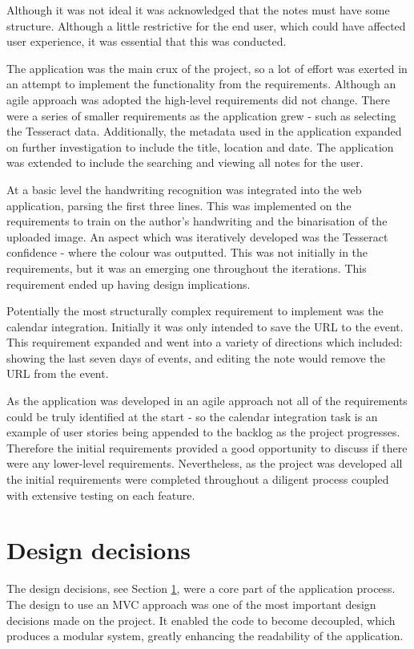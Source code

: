 Although it was not ideal it was acknowledged that the notes must have some structure. Although a little restrictive for the end user, which could have affected user experience, it was essential that this was conducted.

The application was the main crux of the project, so a lot of effort was exerted in an attempt to implement the functionality from the requirements. Although an agile approach was adopted the high-level requirements did not change. There were a series of smaller requirements as the application grew - such as selecting the Tesseract data. Additionally, the metadata used in the application expanded on further investigation to include the title, location and date. The application was extended to include the searching and viewing all notes for the user.

At a basic level the handwriting recognition was integrated into the web application, parsing the first three lines. This was implemented on the requirements to train on the author's handwriting and the binarisation of the uploaded image. An aspect which was iteratively developed was the Tesseract confidence - where the colour was outputted. This was not initially in the requirements, but it was an emerging one throughout the iterations. This requirement ended up having design implications.

Potentially the most structurally complex requirement to implement was the calendar integration. Initially it was only intended to save the URL to the event. This requirement expanded and went into a variety of directions which included: showing the last seven days of events, and editing the note would remove the URL from the event.

As the application was developed in an agile approach not all of the requirements could be truly identified at the start - so the calendar integration task is an example of user stories being appended to the backlog as the project progresses. Therefore the initial requirements provided a good opportunity to discuss if there were any lower-level requirements. Nevertheless, as the project was developed all the initial requirements were completed throughout a diligent process coupled with extensive testing on each feature.

\section{Design decisions}
The design decisions, see Section \ref{}, were a core part of the application process. The design to use an MVC approach was one of the most important design decisions made on the project. It enabled the code to become decoupled, which produces a modular system, greatly enhancing the readability of the application.

